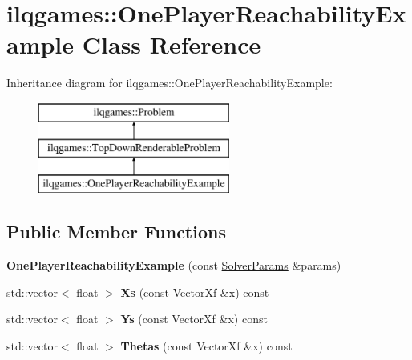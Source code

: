 \hypertarget{classilqgames_1_1_one_player_reachability_example}{}\section{ilqgames\+:\+:One\+Player\+Reachability\+Example Class Reference}
\label{classilqgames_1_1_one_player_reachability_example}
Inheritance diagram for ilqgames\+:\+:One\+Player\+Reachability\+Example\+:\begin{figure}[H]
\begin{center}
\leavevmode
\includegraphics[height=3.000000cm]{classilqgames_1_1_one_player_reachability_example}
\end{center}
\end{figure}
\subsection*{Public Member Functions}
\begin{DoxyCompactItemize}
\item 
{\bfseries One\+Player\+Reachability\+Example} (const \hyperlink{structilqgames_1_1_solver_params}{Solver\+Params} \&params)\hypertarget{classilqgames_1_1_one_player_reachability_example_ae869f0af67f9804929056fb34e723d41}{}\label{classilqgames_1_1_one_player_reachability_example_ae869f0af67f9804929056fb34e723d41}

\item 
std\+::vector$<$ float $>$ {\bfseries Xs} (const Vector\+Xf \&x) const \hypertarget{classilqgames_1_1_one_player_reachability_example_a1209e4293042afbb8aa9b4cd6f8af7c6}{}\label{classilqgames_1_1_one_player_reachability_example_a1209e4293042afbb8aa9b4cd6f8af7c6}

\item 
std\+::vector$<$ float $>$ {\bfseries Ys} (const Vector\+Xf \&x) const \hypertarget{classilqgames_1_1_one_player_reachability_example_affa80730ce318688c06f7b54163bf80f}{}\label{classilqgames_1_1_one_player_reachability_example_affa80730ce318688c06f7b54163bf80f}

\item 
std\+::vector$<$ float $>$ {\bfseries Thetas} (const Vector\+Xf \&x) const \hypertarget{classilqgames_1_1_one_player_reachability_example_ad4a4dffe34cfff22eae36e5c3235c3ff}{}\label{classilqgames_1_1_one_player_reachability_example_ad4a4dffe34cfff22eae36e5c3235c3ff}

\end{DoxyCompactItemize}
